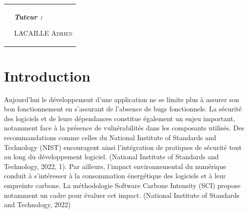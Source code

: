 \documentclass[a4paper,12pt]{article}
\begin{document}
\begin{titlepage}
\begin{center}
\begin{tabularx}{0.90\textwidth}{>{\raggedright\arraybackslash}X >{\raggedleft\arraybackslash}X}
\begin{flushleft}
\end{flushleft}

&


\begin{flushright}

\textit{\textbf{Tuteur :}}

\vspace{0.15cm}

\textsc{LACAILLE Adrien}

\end{flushright}

\end{tabularx}

\end{center}

\vspace{1.3cm}

\end{titlepage}


\clearpage

\pagestyle{fancy}

\renewcommand{\contentsname}{Table des matières}

\tableofcontents


\clearpage
\setcounter{page}{3}

\makeatletter
\providecommand{\code}[1]{{\urlstyle{tt}\path{#1}}}
\g@addto@macro{\UrlBreaks}{\do\_\do\-\do\(\do\)\do\:}
\makeatother

\section*{Introduction}\label{introduction}

Aujourd'hui le développement d'une application ne se limite plus à
assurer son bon fonctionnement en s'assurant de l'absence de bugs
fonctionnels. La sécurité des logiciels et de leurs dépendances
constitue également un enjeu important, notamment face à la présence de
vulnérabilités dans les composants utilisés. Des recommandations comme
celles du National Institute of Standards and Technology (NIST)
encouragent ainsi l'intégration de pratiques de sécurité tout au long du
développement logiciel. (National Institute of Standards and Technology,
2022, 1). Par ailleurs, l'impact environnemental du numérique conduit à
s'intéresser à la consommation énergétique des logiciels et à leur
empreinte carbone. La méthodologie Software Carbone Intensity (SCI)
propose notamment un cadre pour évaluer cet impact. (National Institute
of Standards and Technology, 2022)
\end{document}
